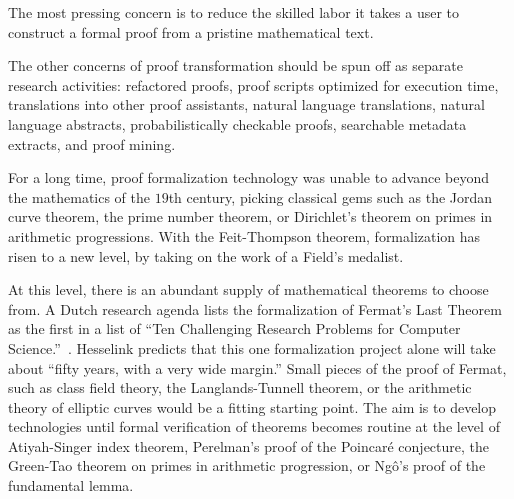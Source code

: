 \documentclass{llncs}
\begin{document}
%
The most pressing concern is to 
reduce the skilled labor it takes a user to construct a formal proof
from a pristine mathematical text.

The other concerns of proof transformation should be spun off as separate
research activities: refactored proofs,
proof scripts optimized for execution time, translations into other
proof assistants, natural language translations, natural language
abstracts, probabilistically checkable proofs, searchable metadata
extracts, and proof mining.


\bigskip

For a long time, proof formalization technology was unable to advance
beyond the mathematics of the $19$th century, picking classical gems
such as the Jordan curve theorem, the prime number theorem, or
Dirichlet's theorem on primes in arithmetic progressions.  With the
Feit-Thompson theorem, formalization has risen to a new level, by
taking on the work of a Field's medalist.

At this level, there is an abundant supply of mathematical theorems to
choose from.  A Dutch research agenda 
lists the formalization of Fermat's Last Theorem as the first in a
list of ``Ten Challenging Research Problems for Computer
Science.''~\cite{Berg}.  Hesselink predicts that this one
formalization project alone will take about ``fifty years, with a very
wide margin.''
Small pieces of the proof of Fermat, such as class field theory, the
Langlands-Tunnell theorem, or the arithmetic theory of elliptic curves
would be a fitting starting point.  The aim is to develop technologies
until formal verification of theorems becomes routine at the level of
Atiyah-Singer index theorem, Perelman's proof of the Poincar\'e
conjecture, the Green-Tao theorem on primes in arithmetic progression,
or Ng\^o's proof of the fundamental lemma.
\end{document}
